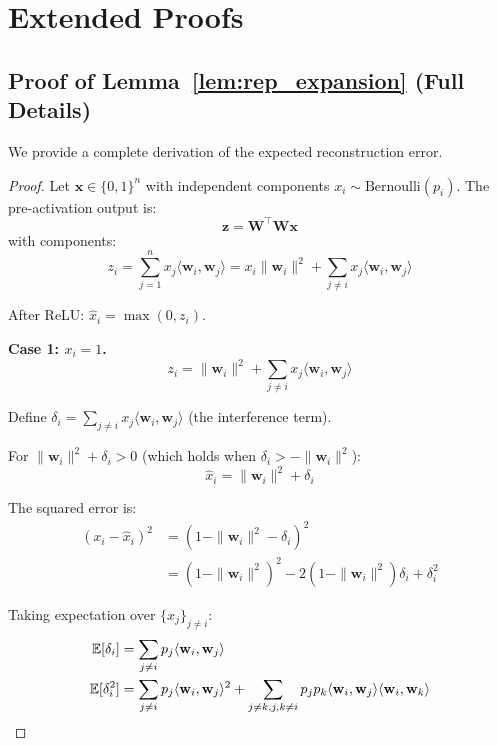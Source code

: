 \section{Extended Proofs}
\label{app:proofs}

\subsection{Proof of Lemma~\ref{lem:rep_expansion} (Full Details)}

We provide a complete derivation of the expected reconstruction error.

\begin{proof}
Let $\mathbf{x} \in \{0,1\}^n$ with independent components $x_i \sim \text{Bernoulli}(p_i)$. The pre-activation output is:
\begin{equation}
\mathbf{z} = \mathbf{W}^\top \mathbf{W} \mathbf{x}
\end{equation}
with components:
\begin{equation}
z_i = \sum_{j=1}^n x_j \langle \mathbf{w}_i, \mathbf{w}_j \rangle = x_i \|\mathbf{w}_i\|^2 + \sum_{j \neq i} x_j \langle \mathbf{w}_i, \mathbf{w}_j \rangle
\end{equation}

After ReLU: $\hat{x}_i = \max(0, z_i)$.

\textbf{Case 1: $x_i = 1$.}
\begin{equation}
z_i = \|\mathbf{w}_i\|^2 + \sum_{j \neq i} x_j \langle \mathbf{w}_i, \mathbf{w}_j \rangle
\end{equation}

Define $\delta_i = \sum_{j \neq i} x_j \langle \mathbf{w}_i, \mathbf{w}_j \rangle$ (the interference term).

For $\|\mathbf{w}_i\|^2 + \delta_i > 0$ (which holds when $\delta_i > -\|\mathbf{w}_i\|^2$):
\begin{equation}
\hat{x}_i = \|\mathbf{w}_i\|^2 + \delta_i
\end{equation}

The squared error is:
\begin{align}
(x_i - \hat{x}_i)^2 &= (1 - \|\mathbf{w}_i\|^2 - \delta_i)^2 \\
&= (1 - \|\mathbf{w}_i\|^2)^2 - 2(1 - \|\mathbf{w}_i\|^2)\delta_i + \delta_i^2
\end{align}

Taking expectation over $\{x_j\}_{j \neq i}$:
\begin{align}
\mathbb{E}[\delta_i] &= \sum_{j \neq i} p_j \langle \mathbf{w}_i, \mathbf{w}_j \rangle \\
\mathbb{E}[\delta_i^2] &= \sum_{j \neq i} p_j \langle \mathbf{w}_i, \mathbf{w}_j \rangle^2 + \sum_{j \neq k, j,k \neq i} p_j p_k \langle \mathbf{w}_i, \mathbf{w}_j \rangle \langle \mathbf{w}_i, \mathbf{w}_k \rangle
\end{align}


\end{proof}
